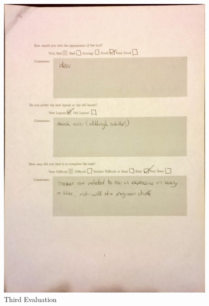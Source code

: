 \begin{figure}[h!]
    \centering
    \includegraphics[width=0.95\textwidth]{images/user_eval/user_eval_18.jpg}
    \caption{Third Evaluation}
\end{figure}

